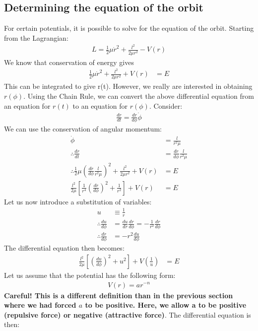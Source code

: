 \subsection{Determining the equation of the orbit}
For certain potentials, it is possible to solve for the equation of the orbit. Starting from the Lagrangian:
\begin{align}
L=\frac{1}{2}\mu\dot{r}^2+\frac{l^2}{2\mu r^2}-V(r)
\end{align}
We know that conservation of energy gives
\begin{align}
\frac{1}{2}\mu\dot{r}^2+\frac{l^2}{2\mu r^2}+V(r)&=E\nonumber
\end{align}
This can be integrated to give r(t). However, we really are interested in obtaining $r(\phi)$. Using the Chain Rule, we can convert the above differential equation from an equation for $r(t)$ to an equation for $r(\phi)$. Consider:
\begin{align}
\frac{dr}{dt}=\frac{dr}{d\phi}\dot\phi
\end{align}
We can use the conservation of angular momentum:
\begin{align}
\dot\phi&=\frac{l}{r^2\mu}\nonumber\\
\therefore \frac{dr}{dt}&=\frac{dr}{d\phi}\frac{l}{r^2\mu}\nonumber\\
\therefore \frac{1}{2}\mu\left( \frac{dr}{d\phi}\frac{l}{r^2\mu} \right)^2+\frac{l^2}{2\mu r^2}+V(r)&=E\nonumber\\
\frac{l^2}{2\mu}\left[\frac{1}{r^4}\left( \frac{dr}{d\phi} \right)^2+\frac{1}{r^2}\right]+V(r)&=E
\end{align}
Let us now introduce a substitution of variables:
\begin{align}
u&\equiv \frac{1}{r}\nonumber\\
\therefore \frac{du}{d\phi}&=\frac{du}{dr} \frac{dr}{d\phi}= -\frac{1}{r^2} \frac{dr}{d\phi} \nonumber\\
\therefore \frac{dr}{d\phi}&=-r^2\frac{du}{d\phi}
\end{align}
The differential equation then becomes:
\begin{align}
\frac{l^2}{2\mu}\left[\left( \frac{du}{d\phi} \right)^2+u^2\right]+V(\frac{1}{u})&=E
\end{align}
Let us assume that the potential has the following form:
\begin{align}
V(r)=ar^{-n}
\end{align}
\textbf{Careful! This is a different definition than in the previous section where we had forced $a$ to be positive. Here, we allow a to be positive (repulsive force) or negative (attractive force)}. The differential equation is then:
